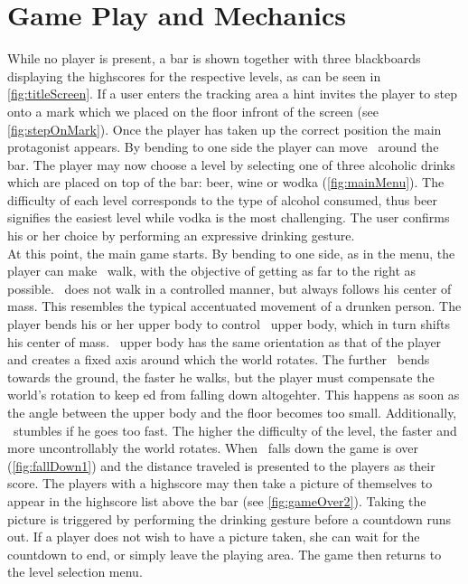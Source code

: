 \documentclass{chi-ext}
\begin{document}
\section{Game Play and Mechanics}
While no player is present, a bar is shown together with three blackboards displaying the highscores for the respective levels, as can be seen in \autoref{fig:titleScreen}. If a user enters the tracking area a hint invites the player to step onto a mark which we placed on the floor infront of the screen (see \autoref{fig:stepOnMark}). Once the player has taken up the correct position the main protagonist \ed appears. By bending to one side the player can move \ed\ around the bar. The player may now choose a level by selecting one of three alcoholic drinks which are placed on top of the bar: beer, wine or wodka (\autoref{fig:mainMenu}). The difficulty of each level corresponds to the type of alcohol consumed, thus beer signifies the easiest level while vodka is the most challenging. The user confirms his or her choice by performing an expressive drinking gesture.\\
At this point, the main game starts. By bending to one side, as in the menu, the player can make \ed\ walk, with the objective of getting as far to the right as possible. \ed\ does not walk in a controlled manner, but always follows his center of mass. This resembles the typical accentuated movement of a drunken person. The player bends his or her upper body to control \eds\ upper body, which in turn shifts his center of mass. \eds\ upper body has the same orientation as that of the player and creates a fixed axis around which the world rotates. The further \ed\ bends towards the ground, the faster he walks, but the player must compensate the world's rotation to keep ed from falling down altogehter. This happens as soon as the angle between the upper body and the floor becomes too small. Additionally, \ed\ stumbles if he goes too fast.
The higher the difficulty of the level, the faster and more uncontrollably the world rotates.\lbreak
When \ed\ falls down the game is over (\autoref{fig:fallDown1}) and the distance traveled is presented to the players as their score. The players with a highscore may then take a picture of themselves to appear in the highscore list above the bar (see \autoref{fig:gameOver2}). Taking the picture is triggered by performing the drinking gesture before a countdown runs out. If a player does not wish to have a picture taken, she can wait for the countdown to end, or simply leave the playing area. The game then returns to the level selection menu.\lbreak
\end{document}

